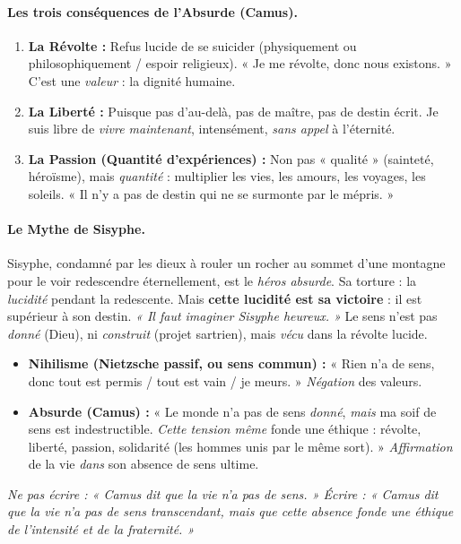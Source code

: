 \documentclass[11pt]{article}
\begin{document}
\paragraph{Les trois conséquences de l'Absurde (Camus).}
\begin{enumerate}
    \item \textbf{La Révolte :} Refus lucide de se suicider (physiquement ou philosophiquement / espoir religieux). « Je me révolte, donc nous existons. » C'est une \emph{valeur} : la dignité humaine.
    \item \textbf{La Liberté :} Puisque pas d'au-delà, pas de maître, pas de destin écrit. Je suis libre de \emph{vivre maintenant}, intensément, \emph{sans appel} à l'éternité.
    \item \textbf{La Passion (Quantité d'expériences) :} Non pas « qualité » (sainteté, héroïsme), mais \emph{quantité} : multiplier les vies, les amours, les voyages, les soleils. « Il n'y a pas de destin qui ne se surmonte par le mépris. »
\end{enumerate}

\paragraph{Le Mythe de Sisyphe.}
Sisyphe, condamné par les dieux à rouler un rocher au sommet d'une montagne pour le voir redescendre éternellement, est le \emph{héros absurde}. Sa torture : la \emph{lucidité} pendant la redescente. Mais \textbf{cette lucidité est sa victoire} : il est supérieur à son destin. \emph{« Il faut imaginer Sisyphe heureux. »} Le sens n'est pas \emph{donné} (Dieu), ni \emph{construit} (projet sartrien), mais \emph{vécu} dans la révolte lucide.

\begin{attention}
\begin{itemize}
    \item \textbf{Nihilisme (Nietzsche passif, ou sens commun) :} « Rien n'a de sens, donc tout est permis / tout est vain / je meurs. » \emph{Négation} des valeurs.
    \item \textbf{Absurde (Camus) :} « Le monde n'a pas de sens \emph{donné}, \emph{mais} ma soif de sens est indestructible. \emph{Cette tension même} fonde une éthique : révolte, liberté, passion, solidarité (les hommes unis par le même sort). » \emph{Affirmation} de la vie \emph{dans} son absence de sens ultime.
\end{itemize}
\emph{Ne pas écrire : « Camus dit que la vie n'a pas de sens. » Écrire : « Camus dit que la vie n'a pas de sens \emph{transcendant}, mais que cette absence fonde une éthique de l'intensité et de la fraternité. »}
\end{attention}
\end{document}
